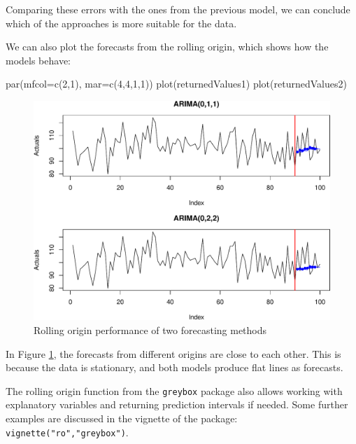 \documentclass[
]{book}
\newenvironment{Shaded}{\begin{snugshade}}{\end{snugshade}}
\newcommand{\AttributeTok}[1]{\textcolor[rgb]{0.77,0.63,0.00}{#1}}
\newcommand{\DecValTok}[1]{\textcolor[rgb]{0.00,0.00,0.81}{#1}}
\newcommand{\FunctionTok}[1]{\textcolor[rgb]{0.00,0.00,0.00}{#1}}
\newcommand{\NormalTok}[1]{#1}
\theoremstyle{definition}
\theoremstyle{definition}
\theoremstyle{definition}
\theoremstyle{definition}
\theoremstyle{remark}
\begin{document}
Comparing these errors with the ones from the previous model, we can conclude which of the approaches is more suitable for the data.

We can also plot the forecasts from the rolling origin, which shows how the models behave:

\begin{Shaded}
\begin{Highlighting}[]
\FunctionTok{par}\NormalTok{(}\AttributeTok{mfcol=}\FunctionTok{c}\NormalTok{(}\DecValTok{2}\NormalTok{,}\DecValTok{1}\NormalTok{), }\AttributeTok{mar=}\FunctionTok{c}\NormalTok{(}\DecValTok{4}\NormalTok{,}\DecValTok{4}\NormalTok{,}\DecValTok{1}\NormalTok{,}\DecValTok{1}\NormalTok{))}
\FunctionTok{plot}\NormalTok{(returnedValues1)}
\FunctionTok{plot}\NormalTok{(returnedValues2)}
\end{Highlighting}
\end{Shaded}

\begin{figure}
\centering
\includegraphics{Svetunkov--2022----ADAM_files/figure-latex/roExample01-1.pdf}
\caption{\label{fig:roExample01}Rolling origin performance of two forecasting methods}
\end{figure}

In Figure \ref{fig:roExample01}, the forecasts from different origins are close to each other. This is because the data is stationary, and both models produce flat lines as forecasts.

The rolling origin function from the \texttt{greybox} package also allows working with explanatory variables and returning prediction intervals if needed. Some further examples are discussed in the vignette of the package: \texttt{vignette("ro","greybox")}.
\end{document}
